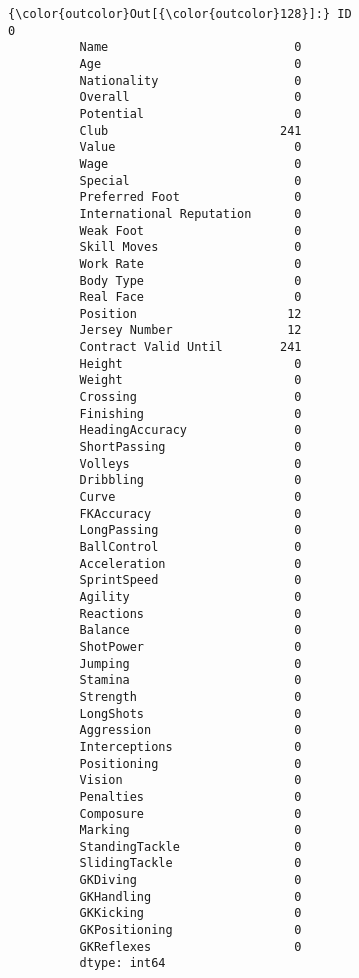 \documentclass[11pt]{article}
\begin{document}
\begin{Verbatim}[commandchars=\\\{\}]
{\color{outcolor}Out[{\color{outcolor}128}]:} ID                            0
          Name                          0
          Age                           0
          Nationality                   0
          Overall                       0
          Potential                     0
          Club                        241
          Value                         0
          Wage                          0
          Special                       0
          Preferred Foot                0
          International Reputation      0
          Weak Foot                     0
          Skill Moves                   0
          Work Rate                     0
          Body Type                     0
          Real Face                     0
          Position                     12
          Jersey Number                12
          Contract Valid Until        241
          Height                        0
          Weight                        0
          Crossing                      0
          Finishing                     0
          HeadingAccuracy               0
          ShortPassing                  0
          Volleys                       0
          Dribbling                     0
          Curve                         0
          FKAccuracy                    0
          LongPassing                   0
          BallControl                   0
          Acceleration                  0
          SprintSpeed                   0
          Agility                       0
          Reactions                     0
          Balance                       0
          ShotPower                     0
          Jumping                       0
          Stamina                       0
          Strength                      0
          LongShots                     0
          Aggression                    0
          Interceptions                 0
          Positioning                   0
          Vision                        0
          Penalties                     0
          Composure                     0
          Marking                       0
          StandingTackle                0
          SlidingTackle                 0
          GKDiving                      0
          GKHandling                    0
          GKKicking                     0
          GKPositioning                 0
          GKReflexes                    0
          dtype: int64
\end{Verbatim}
            
\end{document}
